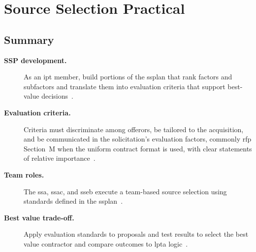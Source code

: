 \documentclass[../main.tex]{subfiles}
\begin{document}

\section{Source Selection Practical}

\subsection{Summary}
\begin{description}
  \item[\textbf{SSP development.}] As an \ac{ipt} member, build portions of the \ac{ssplan} that rank factors and subfactors and translate them into evaluation criteria that support best-value decisions~\autocite{edo-3-2-5-source-selection-practical-2025}.
  \item[\textbf{Evaluation criteria.}] Criteria must discriminate among offerors, be tailored to the acquisition, and be communicated in the solicitation's evaluation factors, commonly \ac{rfp} Section~M when the uniform contract format is used, with clear statements of relative importance~\autocite{edo-3-2-5-source-selection-practical-2025,FAR}.
  \item[\textbf{Team roles.}] The \ac{ssa}, \ac{ssac}, and \ac{sseb} execute a team-based source selection using standards defined in the \ac{ssplan}~\autocite{edo-3-2-5-source-selection-practical-2025}.
  \item[\textbf{Best value trade-off.}] Apply evaluation standards to proposals and test results to select the best value contractor and compare outcomes to \ac{lpta} logic~\autocite{edo-3-2-5-source-selection-practical-2025}.
\end{description}
\end{document}
